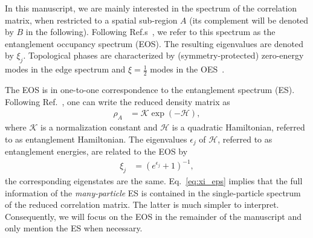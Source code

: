 \documentclass[twocolumn,amsmath,longbibliography,amssymb,superscriptaddress]{revtex4-1}
\newcommand{\mariac}[1]{{\it\color{cyan}#1}}
\begin{document}
In this manuscript, we are mainly interested in the spectrum of the correlation matrix, when restricted to a spatial sub-region $A$ (its complement will be denoted by $B$ in the following). 
Following Ref.s~\cite{Huang2012,Huang2012-2}, we refer to this spectrum as the entanglement occupancy spectrum (EOS). 
The resulting eigenvalues  are denoted by $\xi_j$. 
Topological phases are characterized by (symmetry-protected) zero-energy modes in the edge spectrum and $\xi=\frac 1 2$ modes in the OES~\cite{Fidkowski2010entanglement}.
 

The EOS is in one-to-one correspondence to the entanglement spectrum (ES). 
Following Ref.~\cite{Peschel2008}, one can write the  reduced density matrix as 
\begin{align}\label{eq:red_dens_mat}
\rho_A&=\mathcal{K} \exp(-\mathcal H),
\end{align}
where $\mathcal{K}$ is a normalization constant and $\mathcal{H}$ is a quadratic Hamiltonian, referred to as entanglement Hamiltonian. 
The eigenvalues $\epsilon_j$ of $\mathcal{H}$, referred to as entanglement energies,  are related to the EOS by 
\begin{align}\label{eq:xi_eps}
\xi_j &=\left(e^{\epsilon_j}+1\right)^{-1}, 
\end{align}
the corresponding eigenstates are the same. 
Eq.~\eqref{eq:xi_eps} implies that the full information of the \emph{many-particle} ES is contained in the single-particle spectrum of the reduced correlation matrix. 
The latter is much simpler to interpret. 
Consequently, we will focus on the EOS in the remainder of the manuscript and only mention the ES when necessary. 

\end{document}
